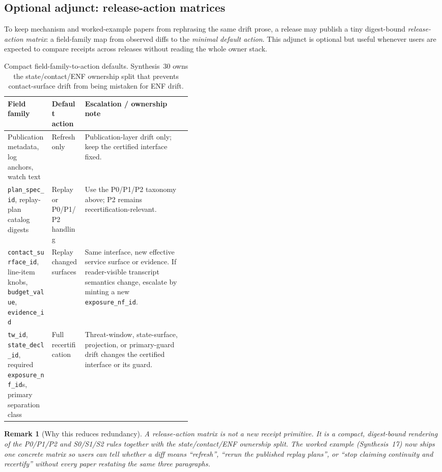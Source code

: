 \documentclass[11pt]{article}
\newtheorem{remark}{Remark}
\begin{document}
\subsection*{Optional adjunct: release-action matrices}
To keep mechanism and worked-example papers from rephrasing the same drift prose, a release may publish a tiny digest-bound \emph{release-action matrix}: a field-family map from observed diffs to the \emph{minimal default action}. This adjunct is optional but useful whenever users are expected to compare receipts across releases without reading the whole owner stack.

\begin{table}[t]
\centering
\small
\begin{tabularx}{\linewidth}{@{}>{\raggedright\arraybackslash}p{0.24\linewidth} >{\raggedright\arraybackslash}p{0.18\linewidth} X@{}}
\toprule
Field family & Default action & Escalation / ownership note \\
\midrule
Publication metadata, log anchors, watch text & Refresh only & Publication-layer drift only; keep the certified interface fixed. \\
\texttt{plan\_spec\_id}, replay-plan catalog digests & Replay or P0/P1/P2 handling & Use the P0/P1/P2 taxonomy above; P2 remains recertification-relevant. \\
\texttt{contact\_surface\_id}, line-item knobs, \texttt{budget\_value}, \texttt{evidence\_id} & Replay changed surfaces & Same interface, new effective service surface or evidence. If reader-visible transcript semantics change, escalate by minting a new \texttt{exposure\_nf\_id}. \\
\texttt{tw\_id}, \texttt{state\_decl\_id}, required \texttt{exposure\_nf\_id}s, primary separation class & Full recertification & Threat-window, state-surface, projection, or primary-guard drift changes the certified interface or its guard. \\
\bottomrule
\end{tabularx}
\caption{Compact field-family-to-action defaults. Synthesis~30 owns the state/contact/ENF ownership split that prevents contact-surface drift from being mistaken for ENF drift.}
\label{tab:releaseactionmatrix}
\end{table}

\begin{remark}[Why this reduces redundancy]
A release-action matrix is not a new receipt primitive.
It is a compact, digest-bound rendering of the P0/P1/P2 and S0/S1/S2 rules together with the state/contact/ENF ownership split.
The worked example (Synthesis~17) now ships one concrete matrix so users can tell whether a diff means ``refresh'', ``rerun the published replay plans'', or ``stop claiming continuity and recertify'' without every paper restating the same three paragraphs.\cite{series:workedexample,series:deployedsurfaces}
\end{remark}
\end{document}
